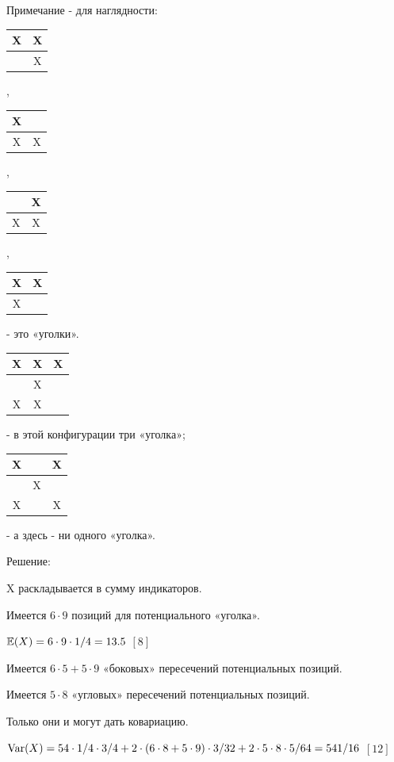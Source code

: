 \documentclass[12pt, a4paper]{article}\usepackage[]{graphicx}\usepackage[]{color}
\begin{document}
\begin{enumerate}
Примечание - для наглядности:
\begin{tabular}{|c|c|}
  \hline
  X & X\\
  \hline
    & X \\
  \hline
\end{tabular},
\begin{tabular}{|c|c|}
  \hline
  X & \\
  \hline
  X & X \\
  \hline
\end{tabular},
\begin{tabular}{|c|c|}
  \hline
   & X\\
  \hline
  X & X \\
  \hline
\end{tabular},
\begin{tabular}{|c|c|}
  \hline
  X & X\\
  \hline
  X &  \\
  \hline
\end{tabular} - это «уголки». \\
\begin{tabular}{|c|c|c|}
  \hline
  X & X & X\\
  \hline
    & X & \\
  \hline
  X & X & \\
  \hline

\end{tabular} - в этой конфигурации три «уголка»;
\begin{tabular}{|c|c|c|}
  \hline
  X &  & X\\
  \hline
    & X & \\
  \hline
  X &  & X\\
  \hline

\end{tabular} - а здесь - ни одного «уголка».

Решение:

X раскладывается в сумму индикаторов.

Имеется $6\cdot9$ позиций для потенциального «уголка».

$\mathbb{E}(X)=6\cdot9\cdot1/4=13.5$ $[8]$

Имеется $6\cdot5+5\cdot9$ «боковых» пересечений потенциальных позиций.

Имеется $5\cdot8$ «угловых» пересечений потенциальных позиций.

Только они и могут дать ковариацию.

$\operatorname{Var}(X)=54\cdot1/4\cdot3/4+2\cdot(6\cdot8+5\cdot9)\cdot3/32+2\cdot5\cdot8\cdot5/64=541/16$ $[12]$
\end{enumerate}
\end{document}
